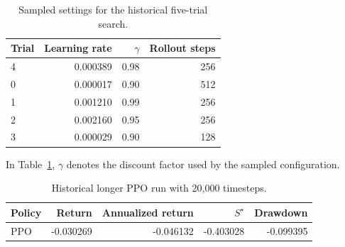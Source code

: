 \documentclass[12pt,a4paper,oneside]{book}
\theoremstyle{plain}
\numberwithin{equation}{chapter} \DeclareMathOperator{\Var}{Var}
\begin{document}
\begin{table}[H]
\centering\small
\caption{Sampled settings for the historical five-trial search.}
\label{tab:settings}
\begin{tabular}{@{}lrrr@{}}
\toprule
Trial & Learning rate & $\gamma$ & Rollout steps \\
\midrule
4 & 0.000389 & 0.98 & 256 \\
0 & 0.000017 & 0.90 & 512 \\
1 & 0.001210 & 0.99 & 256 \\
2 & 0.002160 & 0.95 & 256 \\
3 & 0.000029 & 0.90 & 128 \\
\bottomrule
\end{tabular}
\end{table}
In Table~\ref{tab:settings}, $\gamma$ denotes the discount factor used by the sampled configuration.

\begin{table}[H]
\centering\small
\caption{Historical longer PPO run with 20,000 timesteps.}
\label{tab:longer}
\begin{tabular}{@{}lrrrr@{}}
\toprule
Policy & Return & Annualized return & $S^\star$ & Drawdown \\
\midrule
PPO & -0.030269 & -0.046132 & -0.403028 & -0.099395 \\
\bottomrule
\end{tabular}
\end{table}
\end{document}
